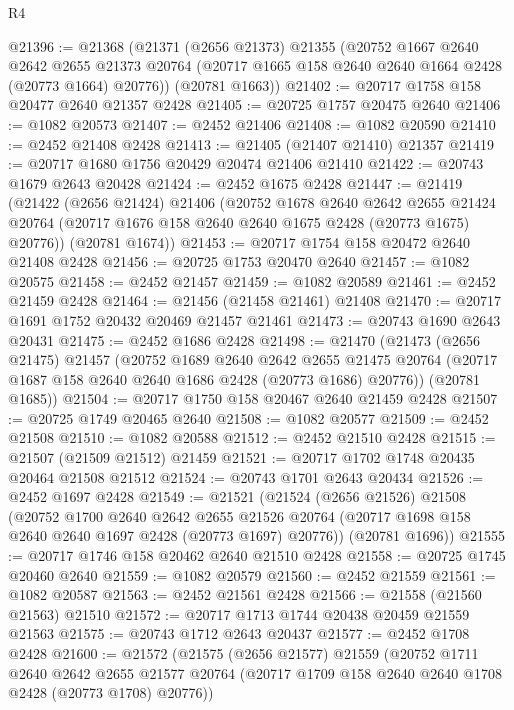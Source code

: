\begin{lexlean}{R4}
\begin{coremodule}
@21396 := @21368
    (@21371
      (@2656 @21373)
      @21355
      (@20752
        @1667
        @2640
        @2642
        @2655
        @21373
        @20764
        (@20717 @1665 @158 @2640 @2640 @1664 @2428 (@20773 @1664) @20776))
      (@20781 @1663))
@21402 := @20717 @1758 @158 @20477 @2640 @21357 @2428
@21405 := @20725 @1757 @20475 @2640
@21406 := @1082 @20573
@21407 := @2452 @21406
@21408 := @1082 @20590
@21410 := @2452 @21408 @2428
@21413 := @21405 (@21407 @21410) @21357
@21419 := @20717 @1680 @1756 @20429 @20474 @21406 @21410
@21422 := @20743 @1679 @2643 @20428
@21424 := @2452 @1675 @2428
@21447 := @21419
    (@21422
      (@2656 @21424)
      @21406
      (@20752
        @1678
        @2640
        @2642
        @2655
        @21424
        @20764
        (@20717 @1676 @158 @2640 @2640 @1675 @2428 (@20773 @1675) @20776))
      (@20781 @1674))
@21453 := @20717 @1754 @158 @20472 @2640 @21408 @2428
@21456 := @20725 @1753 @20470 @2640
@21457 := @1082 @20575
@21458 := @2452 @21457
@21459 := @1082 @20589
@21461 := @2452 @21459 @2428
@21464 := @21456 (@21458 @21461) @21408
@21470 := @20717 @1691 @1752 @20432 @20469 @21457 @21461
@21473 := @20743 @1690 @2643 @20431
@21475 := @2452 @1686 @2428
@21498 := @21470
    (@21473
      (@2656 @21475)
      @21457
      (@20752
        @1689
        @2640
        @2642
        @2655
        @21475
        @20764
        (@20717 @1687 @158 @2640 @2640 @1686 @2428 (@20773 @1686) @20776))
      (@20781 @1685))
@21504 := @20717 @1750 @158 @20467 @2640 @21459 @2428
@21507 := @20725 @1749 @20465 @2640
@21508 := @1082 @20577
@21509 := @2452 @21508
@21510 := @1082 @20588
@21512 := @2452 @21510 @2428
@21515 := @21507 (@21509 @21512) @21459
@21521 := @20717 @1702 @1748 @20435 @20464 @21508 @21512
@21524 := @20743 @1701 @2643 @20434
@21526 := @2452 @1697 @2428
@21549 := @21521
    (@21524
      (@2656 @21526)
      @21508
      (@20752
        @1700
        @2640
        @2642
        @2655
        @21526
        @20764
        (@20717 @1698 @158 @2640 @2640 @1697 @2428 (@20773 @1697) @20776))
      (@20781 @1696))
@21555 := @20717 @1746 @158 @20462 @2640 @21510 @2428
@21558 := @20725 @1745 @20460 @2640
@21559 := @1082 @20579
@21560 := @2452 @21559
@21561 := @1082 @20587
@21563 := @2452 @21561 @2428
@21566 := @21558 (@21560 @21563) @21510
@21572 := @20717 @1713 @1744 @20438 @20459 @21559 @21563
@21575 := @20743 @1712 @2643 @20437
@21577 := @2452 @1708 @2428
@21600 := @21572
    (@21575
      (@2656 @21577)
      @21559
      (@20752
        @1711
        @2640
        @2642
        @2655
        @21577
        @20764
        (@20717 @1709 @158 @2640 @2640 @1708 @2428 (@20773 @1708) @20776))

\end{coremodule}
\end{lexlean}
